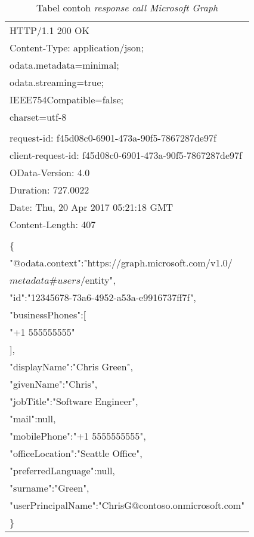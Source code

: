 \documentclass[a4paper,twoside]{article}
\begin{document}
\begin{enumerate}
\begin{table}[H]
	\centering 
	\caption{Tabel contoh \textit{response} \textit{call Microsoft Graph}}
	\label{tab:contoh_response_call_microsoft_graph}
	\begin{tabular}{|p{12cm}|}
	\hline
	HTTP/1.1 200 OK\\
Content-Type: application/json;\\
odata.metadata=minimal;\\
odata.streaming=true;\\
IEEE754Compatible=false;\\
charset=utf-8\\
\\
request-id: f45d08c0-6901-473a-90f5-7867287de97f\\
client-request-id: f45d08c0-6901-473a-90f5-7867287de97f\\
OData-Version: 4.0\\
Duration: 727.0022\\
Date: Thu, 20 Apr 2017 05:21:18 GMT\\
Content-Length: 407\\
\\
\{\\
    "@odata.context":"https://graph.microsoft.com/v1.0/\\
    $metadata\#users/$entity",\\
    "id":"12345678-73a6-4952-a53a-e9916737ff7f",\\
    "businessPhones":[\\
        "+1 555555555"\\
    ],\\
    "displayName":"Chris Green",\\
    "givenName":"Chris",\\
    "jobTitle":"Software Engineer",\\
    "mail":null,\\
    "mobilePhone":"+1 5555555555",\\
    "officeLocation":"Seattle Office",\\
    "preferredLanguage":null,\\
    "surname":"Green",\\
    "userPrincipalName":"ChrisG@contoso.onmicrosoft.com"\\
\}\\
	\hline
	\end{tabular}  
\end{table}


\end{enumerate}
\end{document}

